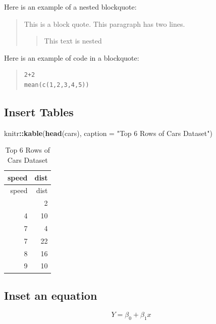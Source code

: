 \documentclass[
]{article}
\newenvironment{Shaded}{\begin{snugshade}}{\end{snugshade}}
\newcommand{\AttributeTok}[1]{\textcolor[rgb]{0.13,0.29,0.53}{#1}}
\newcommand{\FunctionTok}[1]{\textcolor[rgb]{0.13,0.29,0.53}{\textbf{#1}}}
\newcommand{\NormalTok}[1]{#1}
\newcommand{\SpecialCharTok}[1]{\textcolor[rgb]{0.81,0.36,0.00}{\textbf{#1}}}
\newcommand{\StringTok}[1]{\textcolor[rgb]{0.31,0.60,0.02}{#1}}
\begin{document}
Here is an example of a nested blockquote:

\begin{quote}
This is a block quote. This paragraph has two lines.

\begin{quote}
This text is nested
\end{quote}
\end{quote}

Here is an example of code in a blockquote:

\begin{quote}
\begin{verbatim}
2+2
mean(c(1,2,3,4,5))
\end{verbatim}
\end{quote}

\subsection{Insert Tables}\label{insert-tables}

\begin{Shaded}
\begin{Highlighting}[]
\NormalTok{knitr}\SpecialCharTok{::}\FunctionTok{kable}\NormalTok{(}\FunctionTok{head}\NormalTok{(cars),}
             \AttributeTok{caption =} \StringTok{"Top 6 Rows of Cars Dataset"}\NormalTok{)}
\end{Highlighting}
\end{Shaded}

\begin{longtable}[]{@{}rr@{}}
\caption{Top 6 Rows of Cars Dataset}\tabularnewline
\toprule\noalign{}
speed & dist \\
\midrule\noalign{}
\endfirsthead
\toprule\noalign{}
speed & dist \\
\midrule\noalign{}
\endhead
\bottomrule\noalign{}
\endlastfoot
4 & 2 \\
4 & 10 \\
7 & 4 \\
7 & 22 \\
8 & 16 \\
9 & 10 \\
\end{longtable}

\subsection{Inset an equation}\label{inset-an-equation}

\[ Y = \beta_0 + \beta_1x \]
\end{document}
